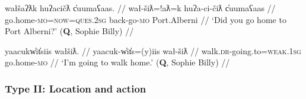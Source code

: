 \ex \label{ex:gohometoalberni}
\begingl
\glpreamble wałšaʔƛk huʔacičƛ c̓uumaʕaas. //
\gla wał-šiƛ=!aƛ=k huʔa-ci-čiƛ c̓uumaʕaas  //
\glb go.home-\textsc{mo}=\textsc{now}=\textsc{ques.2sg} back-go-\textsc{mo} Port.Alberni //
\glft `Did you go home to Port Alberni?' (\textbf{Q}, Sophie Billy) //
\endgl
\xe

\ex \label{ex:goingtowalkhome}
\begingl
\glpreamble yaacukw̓it̓siis wałšiƛ. //
\gla yaacuk-w̓it̓s=(y)iis wał-šiƛ  //
\glb walk.\textsc{dr}-going.to=\textsc{weak.1sg} go.home-\textsc{mo} //
\glft `I'm going to walk home.' (\textbf{Q}, Sophie Billy) //
\endgl
\xe

\begin{comment}
\ex \label{ex:movetovictoria1}
\begingl
\glpreamble ʔucičƛiis šiiƛuk mituunii. //
\gla ʔu-ci-čiƛ=(y)iis šiiƛuk mituunii  //
\glb \textsc{x}-go-\textsc{mo}=\textsc{weak.1sg} move.house.\textsc{dr} Victoria //
\glft `I moved to Victoria.' (\textbf{Q}, Sophie Billy) //
\endgl
\xe

[[šiiƛuk is ambiguous between PF and IMPF, so don’t use it, use one of SB’s other examples.]]

\ex~ \label{ex:movetovictoria2}
\begingl
\glpreamble ʔuuct̓iiḥiis šiiƛuk mituunii. //
\gla ʔuuct̓iiḥ=(y)iis šiiƛuk mituunii  //
\glb go.toward.\textsc{dr}=\textsc{weak.1sg} move.house.\textsc{dr} Victoria //
\glft `I moved to Victoria.' (\textbf{Q}, Sophie Billy) //
\endgl
\xe
\end{comment}

\begin{comment}
Ordering preference. One of my speakers expressed a strong preference for the manner verb to precede the action. This mirrors how adverbs are used in Nuuchahnulth, which also tend to precede the verb. Other speakers I consulted with were comfortable with the verbs coming in either order.

\ex \label{ex:gohomedrive}
\begingl
\glpreamble ʔucičƛsiš šiiƛuk mituuni. //
\gla ʔu-ci-čiƛ=siˑš šiiƛuk mituuni  //
\glb \textsc{x}-go-\textsc{mo}=\textsc{strg.1sg} move.house-\textsc{dr} Victoria //
\glft `I moved to Victoria.' (\textbf{Q}, Sophie Billy) //
\endgl
\xe
FH
*waałšiʔaƛs ƛiiƛiiḥataḥ.
waałšiʔaƛs. ƛiiƛiiḥataḥʔaƛs.
\end{comment}

\vspace{10pt}

\subsubsection{Type II: Location and action} \label{ch:sv:data:type2}

